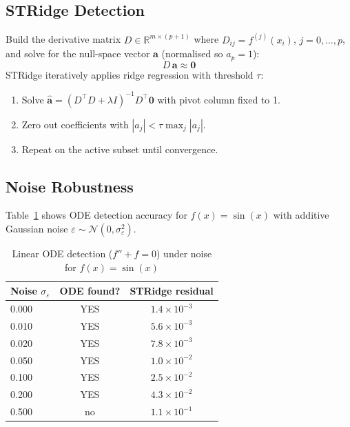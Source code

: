 \documentclass[11pt,a4paper]{article}
\begin{document}
\subsection{STRidge Detection}

Build the derivative matrix $D \in \mathbb{R}^{m \times (p+1)}$ where
$D_{ij} = f^{(j)}(x_i)$, $j=0,\ldots,p$, and solve for the null-space vector
$\mathbf{a}$ (normalised so $a_p = 1$):
\begin{equation}
  D\,\mathbf{a} \approx \mathbf{0}
\end{equation}
STRidge iteratively applies ridge regression with threshold $\tau$:
\begin{enumerate}
  \item Solve $\hat{\mathbf{a}} = (D^\top D + \lambda I)^{-1} D^\top \mathbf{0}$
        with pivot column fixed to 1.
  \item Zero out coefficients with $|a_j| < \tau \max_j |a_j|$.
  \item Repeat on the active subset until convergence.
\end{enumerate}

\subsection{Noise Robustness}

Table~\ref{tab:noise} shows ODE detection accuracy for $f(x) = \sin(x)$ with additive
Gaussian noise $\varepsilon \sim \mathcal{N}(0, \sigma_\varepsilon^2)$.

\begin{table}[h]
\centering
\caption{Linear ODE detection ($f'' + f = 0$) under noise for $f(x)=\sin(x)$}
\label{tab:noise}
\begin{tabular}{lcc}
\toprule
Noise $\sigma_\varepsilon$ & ODE found? & STRidge residual \\
\midrule
0.000 & YES & $1.4 \times 10^{-3}$ \\
0.010 & YES & $5.6 \times 10^{-3}$ \\
0.020 & YES & $7.8 \times 10^{-3}$ \\
0.050 & YES & $1.0 \times 10^{-2}$ \\
0.100 & YES & $2.5 \times 10^{-2}$ \\
0.200 & YES & $4.3 \times 10^{-2}$ \\
0.500 & no  & $1.1 \times 10^{-1}$ \\
\bottomrule
\end{tabular}
\end{table}
\end{document}
